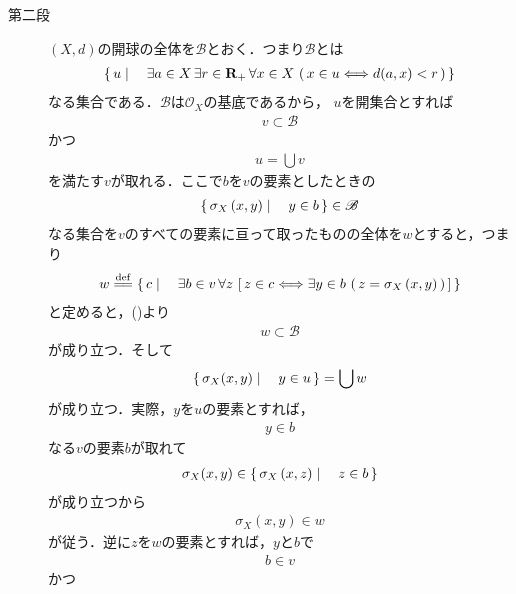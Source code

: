 \begin{sketch}
\begin{description}
			\item[第二段]
				$(X,d)$の開球の全体を$\mathscr{B}$とおく．つまり$\mathscr{B}$とは
				\begin{align}
					\left\{\, u \mid \quad \exists a \in X\, \exists r \in \mathbf{R}_+\, \forall x \in X\, 
					\left(\, x \in u \Longleftrightarrow d(a,x) < r\, \right)\, \right\}
				\end{align}
				なる集合である．$\mathscr{B}$は$\mathscr{O}_X$の基底であるから，
				$u$を開集合とすれば
				\begin{align}
					v \subset \mathscr{B}
				\end{align}
				かつ
				\begin{align}
					u = \bigcup v
				\end{align}
				を満たす$v$が取れる．ここで$b$を$v$の要素としたときの
				\begin{align}
					\left\{\, \sigma_X\left(x,y\right) \mid \quad y \in b\, \right\} \in \mathscr{B}
				\end{align}
				なる集合を$v$のすべての要素に亘って取ったものの全体を$w$とすると，つまり
				\begin{align}
					w \defeq \Set{c}{\exists b \in v\, \forall z\,
					\left[\, z \in c \Longleftrightarrow \exists y \in b\, \left(\, z=\sigma_X\left(x,y\right)\, \right)\, \right]}
				\end{align}
				と定めると，()より
				\begin{align}
					w \subset \mathscr{B}
				\end{align}
				が成り立つ．そして
				\begin{align}
					\left\{\, \sigma_X(x,y) \mid \quad y \in u\, \right\} = \bigcup w
					\label{fom:thm_topology_induced_by_left_invariant_metric_is_invariant_2}
				\end{align}
				が成り立つ．実際，$y$を$u$の要素とすれば，
				\begin{align}
					y \in b
				\end{align}
				なる$v$の要素$b$が取れて
				\begin{align}
					\sigma_X(x,y) \in \left\{\, \sigma_X\left(x,z\right) \mid \quad z \in b\, \right\}
				\end{align}
				が成り立つから
				\begin{align}
					\sigma_X(x,y) \in w
				\end{align}
				が従う．逆に$z$を$w$の要素とすれば，$y$と$b$で
				\begin{align}
					b \in v
				\end{align}
				かつ
				\begin{align}

\end{align}
\end{description}
\end{sketch}
